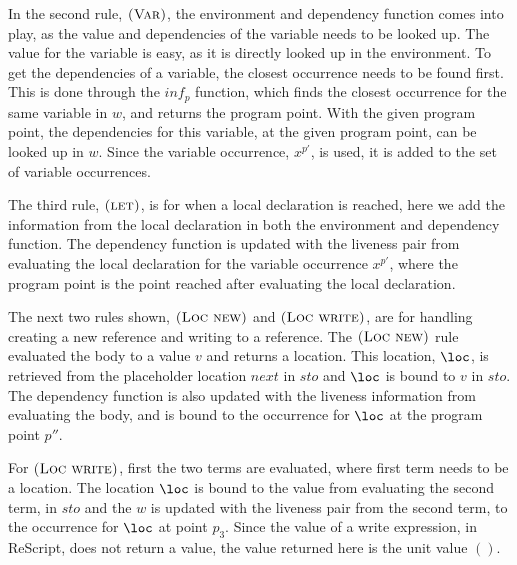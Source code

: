 \documentclass[../../master.tex]{subfiles}
\begin{document}
In the second rule, $\textsc{(Var)}$, the environment and dependency function comes into play, as the value and dependencies of the variable needs to be looked up.
The value for the variable is easy, as it is directly looked up in the environment.
To get the dependencies of a variable, the closest occurrence needs to be found first.
This is done through the $inf_p$ function, which finds the closest occurrence for the same variable in $w$, and returns the program point.
With the given program point, the dependencies for this variable, at the given program point, can be looked up in $w$.
Since the variable occurrence, $x^{p'}$, is used, it is added to the set of variable occurrences.

The third rule, $\textsc{(let)}$, is for when a local declaration is reached, here we add the information from the local declaration in both the environment and dependency function.
The dependency function is updated with the liveness pair from evaluating the local declaration for the variable occurrence $x^{p'}$, where the program point is the point reached after evaluating the local declaration.

The next two rules shown, $\textsc{(Loc new)}$ and $\textsc{(Loc write)}$, are for handling creating a new reference and writing to a reference.
The $\textsc{(Loc new)}$ rule evaluated the body to a value $v$ and returns a location.
This location, $\loc$, is retrieved from the placeholder location $next$ in $sto$ and $\loc$ is bound to $v$ in $sto$.
The dependency function is also updated with the liveness information from evaluating the body, and is bound to the occurrence for $\loc$ at the program point $p''$.

For $\textsc{(Loc write)}$, first the two terms are evaluated, where first term needs to be a location.
The location $\loc$ is bound to the value from evaluating the second term, in $sto$ and the $w$ is updated with the liveness pair from the second term, to the occurrence for $\loc$ at point $p_3$.
Since the value of a write expression, in ReScript, does not return a value, the value returned here is the unit value $()$.
\end{document}

